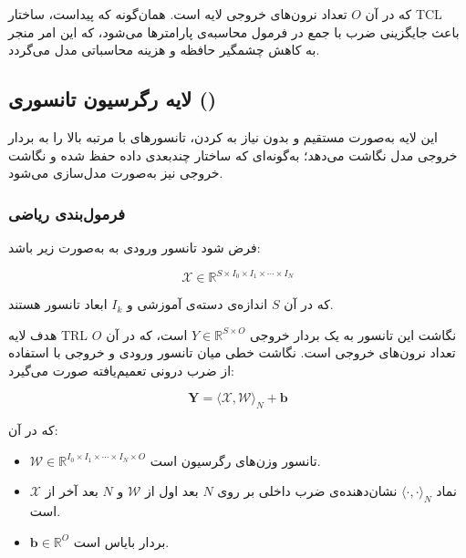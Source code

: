 که در آن $O$ تعداد نرون‌های خروجی لایه است. همان‌گونه که پیداست، ساختار TCL باعث جایگزینی ضرب با جمع در فرمول محاسبه‌ی پارامترها می‌شود، که این امر منجر به کاهش چشمگیر حافظه و هزینه محاسباتی مدل می‌گردد.







\subsection{لایه رگرسیون تانسوری ()}

این لایه به‌صورت مستقیم و بدون نیاز به  کردن، تانسورهای با مرتبه بالا را به بردار خروجی مدل نگاشت می‌دهد؛ به‌گونه‌ای که ساختار چندبعدی داده حفظ شده و نگاشت خروجی نیز به‌صورت  مدل‌سازی می‌شود.

\subsubsection*{فرمول‌بندی ریاضی}

فرض شود تانسور ورودی به  به‌صورت زیر باشد:

\[
\mathcal{X} \in \mathbb{R}^{S \times I_0 \times I_1 \times \cdots \times I_N}
\]

که در آن $S$ اندازه‌ی دسته‌ی آموزشی و $I_k$ ابعاد تانسور هستند.

هدف لایه TRL نگاشت این تانسور به یک بردار خروجی $Y \in \mathbb{R}^{S \times O}$ است، که در آن $O$ تعداد نرون‌های خروجی است. نگاشت خطی میان تانسور ورودی و خروجی با استفاده از ضرب درونی تعمیم‌یافته صورت می‌گیرد:

\[
\mathbf{Y} = \langle \mathcal{X}, \mathcal{W} \rangle_N + \mathbf{b}
\]

که در آن:

\begin{itemize}
	\item $\mathcal{W} \in \mathbb{R}^{I_0 \times I_1 \times \cdots \times I_N \times O}$ تانسور وزن‌های رگرسیون است.
	\item نماد $\langle \cdot, \cdot \rangle_N$ نشان‌دهنده‌ی ضرب داخلی بر روی $N$ بعد اول از $\mathcal{W}$ و $N$ بعد آخر از $\mathcal{X}$ است.
	\item $\mathbf{b} \in \mathbb{R}^{O}$ بردار بایاس است.
\end{itemize}



